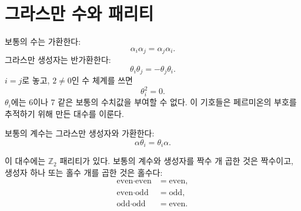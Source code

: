 \section{그라스만 수와 패리티}

보통의 수는 가환한다:
\begin{equation}
\alpha_i\alpha_j=\alpha_j\alpha_i.
\end{equation}
그라스만 생성자는 반가환한다:
\begin{equation}
\theta_i\theta_j=-\theta_j\theta_i.
\end{equation}
\(i=j\)로 놓고, \(2\neq0\)인 수 체계를 쓰면
\begin{equation}
\theta_i^2=0.
\end{equation}
\(\theta_i\)에는 6이나 7 같은 보통의 수치값을 부여할 수 없다. 이 기호들은 페르미온의 부호를 추적하기 위해 만든 대수를 이룬다.

보통의 계수는 그라스만 생성자와 가환한다:
\begin{equation}
\alpha\theta_i=\theta_i\alpha.
\end{equation}

\begin{classroomqa}
\end{classroomqa}

이 대수에는 \(\mathbb Z_2\) 패리티가 있다. 보통의 계수와 생성자를 짝수 개 곱한 것은 짝수이고, 생성자 하나 또는 홀수 개를 곱한 것은 홀수다:
\begin{equation}
\begin{aligned}
\text{even}\cdot\text{even}&=\text{even},\\
\text{even}\cdot\text{odd}&=\text{odd},\\
\text{odd}\cdot\text{odd}&=\text{even}.
\end{aligned}
\end{equation}

\begin{classroomqa}
\end{classroomqa}

